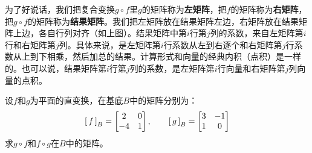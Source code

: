 \documentclass[12pt,UTF8]{ctexbook}
\begin{document}
为了好说话，我们把复合变换$g\circ f$里$g$的矩阵称为\textbf{左矩阵}，把$f$的矩阵称为\textbf{右矩阵}，把$g\circ f$的矩阵称为\textbf{结果矩阵}。我们把左矩阵放在结果矩阵左边，右矩阵放在结果矩阵上边，各自行列对齐（如上图）。结果矩阵中第$i$行第$j$列的系数，来自左矩阵第$i$行和右矩阵第$j$列。具体来说，是左矩阵第$i$行系数从左到右逐个和右矩阵第$j$行系数从上到下相乘，然后加总的结果。计算形式和向量的经典内积（点积）是一样的。也可以说，结果矩阵第$i$行第$j$列的系数，是左矩阵第$i$行向量和右矩阵第$j$列向量的点积。

\begin{et}
    设$f$和$g$为平面的直变换，在基底$B$中的矩阵分别为：
    $$
        \bmat{f}[B] = 
        \begin{bmatrix}
            2 & 0 \\ -4 & 1
        \end{bmatrix},\qquad
        \bmat{g}[B] = 
        \begin{bmatrix}
            3 & -1 \\ 1 & 0
        \end{bmatrix}
    $$
    求$g\circ f$和$f\circ g$在$B$中的矩阵。
\end{et}
\end{document}
